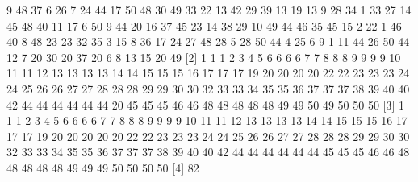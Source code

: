 

\begin{verbbox}[\mbox{}]
[1]  9 48 37 6 26 7 24 44 17 50 48 30 49 33 22 13 42 29 39 13 19 13 9 28 34 1
33 27 14 45 48 40 11 17 6 50 9 44 20 16 37 45 23 14 38 29 10 49 44 46 35 45  
15 2 22 1 46 40 8 48 23 23 32 35 3 15 8 36 17 24 27 48 28 5 28 50 44 4 25 6 9
1 11 44 26 50 44 12 7 20 30 20 37 20 6 8 13 15 20 49
[2]  1 1 1 2 3 4 5 6 6 6 6 7 7 8 8 8 9 9 9 9 10 11 11 12 13 13 13 13 14 14 15 
15 15 16 17 17 17 19 20 20 20 20 22 22 23 23 23 24 24 25 26 26 27 27 28 28 28 
29 29 30 30 32 33 33 34 35 35 36 37 37 37 38 39 40 40 42 44 44 44 44 44 44 20 
45 45 45 46 46 48 48 48 48 48 49 49 50 49 50 50 50
[3]  1 1 1 2 3 4 5 6 6 6 6 7 7 8 8 8 9 9 9 9 10 11 11 12 13 13 13 13 14 14 15 
15 15 16 17 17 17 19 20 20 20 20 20 22 22 23 23 23 24 24 25 26 26 27 27 28 28 
28 29 29 30 30 32 33 33 34 35 35 36 37 37 37 38 39 40 40 42 44 44 44 44 44 44 
45 45 45 46 46 48 48 48 48 48 49 49 49 50 50 50 50
[4]  82
\end{verbbox}
    
